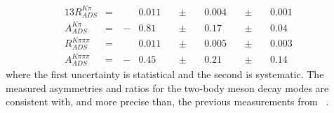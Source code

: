 \begin{alignat*}{13}
R_{ADS}^{K\pi} &= &\ &0.011&\ &\pm&\ &0.004&\ &\pm&\ &0.001& \\
A_{ADS}^{K\pi} &= &\ -&0.81&\ &\pm&\ &0.17&\ &\pm&\ &0.04& \\
R_{ADS}^{K\pi\pi\pi} &= &\ &0.011&\ &\pm&\ &0.005&\ &\pm&\ &0.003& \\
A_{ADS}^{K\pi\pi\pi} &= &\ -&0.45&\ &\pm&\ &0.21&\ &\pm&\ &0.14&
\end{alignat*}
where the first uncertainty is statistical and the second is systematic. The measured asymmetries and ratios for the two-body \Dz meson decay modes are consistent with, and more precise than, the previous measurements from \babar~\cite{BaBarDKstar}.

\begin{table}[htbp]
\centering
{\scriptsize
{}}
\caption{Correlation matrix of the statistical uncertainties for the twelve physics observables from the simultaneous fit to data. Only half of the symmetric matrix is shown.}
\label{statisticalcorrelations}
\end{table}

